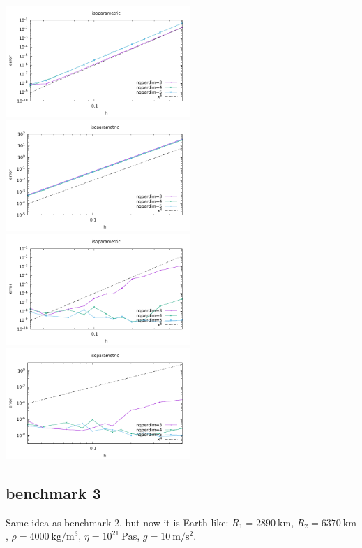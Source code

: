 \begin{center}
\includegraphics[width=7cm]{python_codes/fieldstone_133/results/bench2/errors_v.pdf}
\includegraphics[width=7cm]{python_codes/fieldstone_133/results/bench2/errors_p.pdf}\\
\includegraphics[width=7cm]{python_codes/fieldstone_133/results/bench2/DJ/errors_v.pdf}
\includegraphics[width=7cm]{python_codes/fieldstone_133/results/bench2/DJ/errors_p.pdf}
\end{center}


\newpage
\subsection*{benchmark 3}

Same idea as benchmark 2, but now it is Earth-like: $R_1=2890~\si{\km}$, $R_2=6370~\si{\km}$, 
$\rho=4000~\si{\kg\per\cubic\meter}$, $\eta=10^{21}~\si{\pascal\second}$, 
$g=10~\si{\meter\per\square\second}$.

